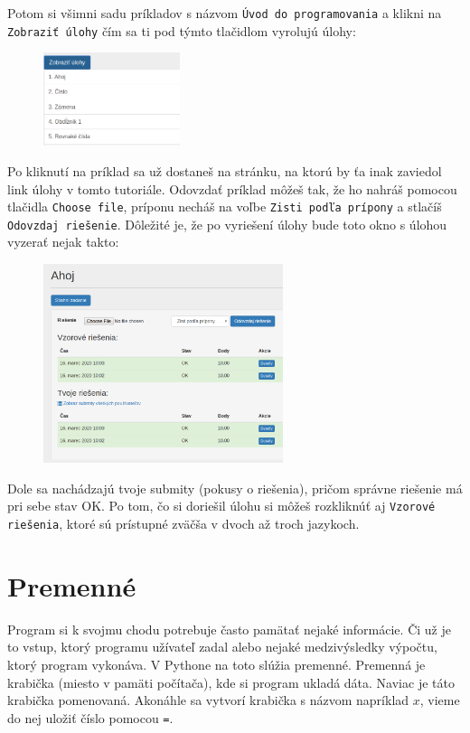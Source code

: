 Potom si všimni sadu príkladov s názvom \texttt{Úvod do programovania} a klikni na \texttt{Zobraziť úlohy} čím sa ti pod týmto tlačidlom vyrolujú úlohy:

\begin{figure}[h]
\includegraphics[width=4cm]{zoznam}
\centering
\end{figure}

Po kliknutí na príklad sa už dostaneš na stránku, na ktorú by ťa inak zaviedol link úlohy v tomto tutoriále. Odovzdať príklad môžeš tak, že ho nahráš pomocou tlačidla \texttt{Choose file}, príponu necháš na voľbe \texttt{Zisti podľa prípony} a stlačíš \texttt{Odovzdaj riešenie}. Dôležité je, že po vyriešení úlohy bude toto okno s úlohou vyzerať nejak takto:

\begin{figure}[h]
\includegraphics[width=7cm]{vyriesene}
\centering
\end{figure}

Dole sa nachádzajú tvoje submity (pokusy o riešenia), pričom správne riešenie má pri sebe stav OK. Po tom, čo si doriešil úlohu si môžeš rozkliknúť aj \texttt{Vzorové riešenia}, ktoré sú prístupné zväčša v dvoch až troch jazykoch.

\section{Premenné}

Program si k svojmu chodu potrebuje často pamätať nejaké informácie. Či už je to vstup, ktorý programu užívateľ zadal alebo nejaké medzivýsledky výpočtu, ktorý program vykonáva. V Pythone na toto slúžia premenné. Premenná je krabička (miesto v pamäti počítača), kde si program ukladá dáta. Naviac je táto krabička pomenovaná. Akonáhle sa vytvorí krabička s názvom napríklad $x$, vieme do nej uložiť číslo pomocou \texttt{=}.

